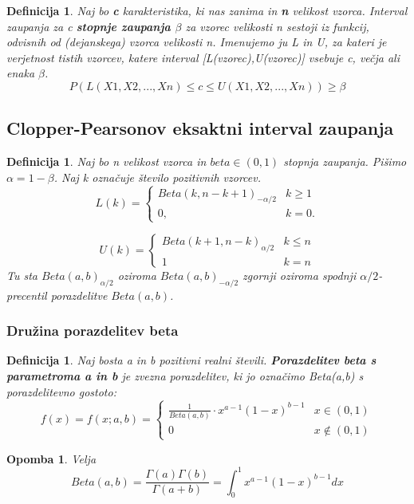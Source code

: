\documentclass[11pt]{article}
\newtheorem{Definicija}[Izrek]{{\sc Definicija}}
\newtheorem{Opomba}[Izrek]{{\sc Opomba}}
\begin{document}
\begin{Definicija}
Naj bo \textbf{c} karakteristika, ki nas zanima in
\textbf{n} velikost vzorca.
Interval zaupanja za c \textbf{stopnje zaupanja $\beta$} za vzorec velikosti n sestoji iz funkcij, odvisnih od (dejanskega) vzorca velikosti n. Imenujemo ju L in U, za kateri je verjetnost tistih vzorcev, katere interval [L(vzorec),U(vzorec)] vsebuje c, večja ali enaka $\beta$.
$$	P(L(X1, X2, . . . , Xn) \le c \le U(X1, X2, . . . , Xn))
\ge \beta$$
\end{Definicija}
\subsection{Clopper-Pearsonov eksaktni interval zaupanja}

\begin{Definicija}
	Naj bo n velikost vzorca in $beta \in (0,1)$ stopnja zaupanja. Pišimo $\alpha = 1 - \beta$. Naj k označuje število pozitivnih vzorcev.
	\[
	L(k)= 
	\begin{cases}
	Beta(k, n-k+1)_{-\alpha/2} & k\ge 1\\
	0,              & k = 0.
	\end{cases}
	\]

	\[
	U(k)= 
	\begin{cases}
	Beta(k+1, n-k)_{\alpha/2}& k\le n\\
	1             & k=n
	\end{cases}
	\]
	Tu sta $Beta(a,b)_{\alpha/2}$ oziroma $Beta(a,b)_{-\alpha/2}$ zgornji oziroma spodnji $\alpha/2$-precentil porazdelitve $Beta(a,b)$.
\end{Definicija}
\subsubsection{Družina porazdelitev beta}
\begin{Definicija}
	Naj bosta a in b pozitivni realni števili. \textbf{Porazdelitev beta s parametroma a in b} je zvezna porazdelitev, ki jo označimo Beta(a,b) s porazdelitevno gostoto:
	\[
	f(x) = f(x;a,b) = 
	\begin{cases}
	\frac{1}{Beta(a,b)} \cdot x^{a-1} (1-x)^{b-1}& x\in(0,1)\\
	0   & x\notin (0,1)
	\end{cases}
	\]
\end{Definicija}
\begin{Opomba}
	Velja $$Beta(a,b) = \frac{\Gamma(a) \Gamma(b)}{\Gamma(a+b)} = \int_{0}^{1}{x^{a-1}(1-x)^{b-1}dx}$$
\end{Opomba}
\end{document}
